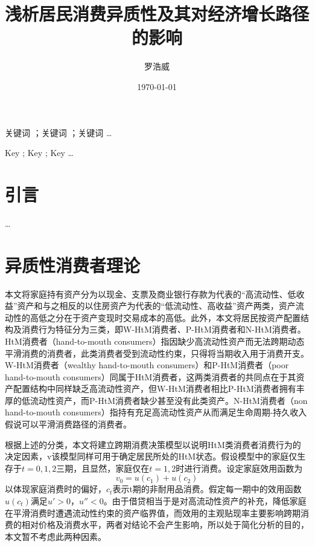 \documentclass[supercite]{HustGraduPaper}
\title{浅析居民消费异质性及其对经济增长路径的影响}
\author{罗浩威}
\date{\today}
\begin{document}
    \maketitle
    \statement
    \clearpage 
    
    \begin{cnabstract}{关键词 ；关键词 ；关键词 }
    \ldots
        
    \end{cnabstract}
    
    \begin{enabstract}{Key ; Key ; Key }
    \ldots
        
    \end{enabstract}

    \tableofcontents
    \clearpage

    \section{引言}
    \ldots

    \section{异质性消费者理论}
    本文将家庭持有资产分为以现金、支票及商业银行存款为代表的“高流动性、低收益”资产和与之相反的以住房资产为代表的“低流动性、高收益”资产两类，资产流动性的高低之分在于资产变现时交易成本的高低。此外，本文将居民按资产配置结构及消费行为特征分为三类，即W-HtM消费者、P-HtM消费者和N-HtM消费者。HtM消费者（hand-to-mouth consumers）指因缺少高流动性资产而无法跨期动态平滑消费的消费者，此类消费者受到流动性约束，只得将当期收入用于消费开支。W-HtM消费者（wealthy hand-to-mouth consumers）和P-HtM消费者（poor hand-to-mouth consumers）同属于HtM消费者，这两类消费者的共同点在于其资产配置结构中同样缺乏高流动性资产，但W-HtM消费者相比P-HtM消费者拥有丰厚的低流动性资产，而P-HtM消费者缺少甚至没有此类资产。N-HtM消费者（non hand-to-mouth consumers）指持有充足高流动性资产从而满足生命周期-持久收入假说可以平滑消费路径的消费者。
    
    根据上述的分类，本文将建立跨期消费决策模型以说明HtM类消费者消费行为的决定因素，v该模型同样可用于确定居民所处的HtM状态。假设模型中的家庭仅生存于$t=0,1,2$三期，且显然，家庭仅在$t=1,2$时进行消费。设定家庭效用函数为
    \begin{equation} 
    v_0=u(c_1)+u(c_2) 
    \end{equation}
    以体现家庭消费时的偏好，$c_t$表示t期的非耐用品消费。假定每一期中的效用函数$u(c_t)$满足$u'>0$，$u''<0$。由于借贷相当于是对高流动性资产的补充，降低家庭在平滑消费时遭遇流动性约束的资产临界值，而效用的主观贴现率主要影响跨期消费的相对价格及消费水平，两者对结论不会产生影响，所以处于简化分析的目的，本文暂不考虑此两种因素。
\end{document}
